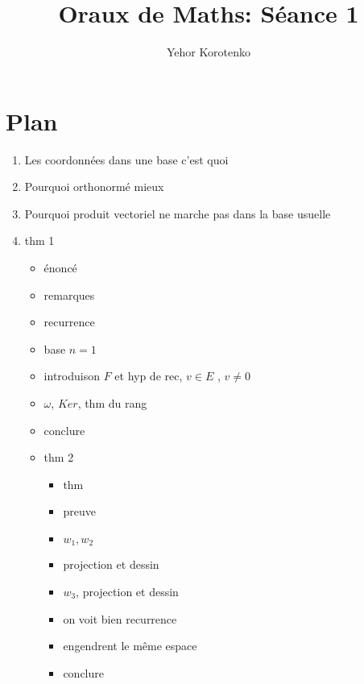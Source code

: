 \documentclass[a4paper]{article}
\author{Yehor Korotenko}
\title{Oraux de Maths: Séance 1}
\begin{document}
   \maketitle 
   \section{Plan}
   \begin{enumerate}
       \item Les coordonnées dans une base c'est quoi
        \item Pourquoi orthonormé mieux
        \item Pourquoi produit vectoriel ne marche pas dans la base usuelle
        \item thm 1
            \begin{itemize}
                \item énoncé
                \item remarques
                \item recurrence
                \item base $n=1$
                \item  introduison $F$ et hyp de rec, $v \in E$ , $v\neq 0$
                \item $\omega$,  $Ker$, thm du rang
                \item conclure
        \item thm 2
            \begin{itemize}
                \item thm
                \item preuve
                \item $w_1, w_2$
                \item  projection et dessin
                \item $w_3$, projection et dessin
                \item on voit bien recurrence
                \item engendrent le même espace
                \item conclure
            \end{itemize}
            \end{itemize}
   \end{enumerate}
   \newpage
\end{document}
